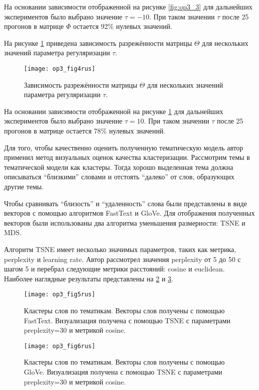 На основании зависимости отображенной на рисунке \ref{fig:op3_3} для дальнейших экспериментов было
выбрано значение $ \tau = -10 $. При таком значении $ \tau $ после 25 прогонов в матрице $\Phi $ остается 92\% нулевых значений.

На рисунке \ref{fig:op3_4}  приведена зависимость разрежённости матрицы $\Theta$  для нескольких значений параметра регуляризации $ \tau $.

\begin{figure}[H]
  \caption{Зависимость разрежённости матрицы $ \Theta $ для нескольких значений параметра регуляризации $ \tau $.}
  \centering
    \texttt{[image: op3\_fig4rus]}
  \label{fig:op3_4}
\end{figure}  

На основании зависимости отображенной на рисунке  \ref{fig:op3_4}  для дальнейших экспериментов было выбрано значение $ \tau  = 10 $. 
При таком значении $ \tau $ после 25 прогонов в матрице остается 78\% нулевых значений.

Для того, чтобы качественно оценить полученную тематическую модель автор применил метод визуальных оценок качества кластеризации.
Рассмотрим темы в тематической модели как кластеры. Тогда хорошо выделенная тема должна описываться ``близкими'' словами и отстоять
``далеко'' от слов, образующих другие темы.

Чтобы сравнивать ``близость'' и ``удаленность'' слова были представлены в виде векторов с помощью алгоритмов FastText и GloVe. Для отображения
полученных векторов были использованы два алгоритма уменьшения размерности: TSNE и MDS.

Алгоритм TSNE имеет несколько значимых параметров, таких как метрика,
perplexity и learning rate. Автор рассмотрел значения perplexity от 5
до 50 с шагом 5 и перебрал следующие метрики расстояний: cosine и euclidean. 
Наиболее наглядные результаты представлены на \ref{fig:op3_5} и \ref{fig:op3_6}. 

\begin{figure}[H]
  \caption{Кластеры слов по тематикам. Векторы слов получены с помощью FastText. Визуализация получена с помощью TSNE с параметрами preplexity=30 и метрикой cosine.}
  \centering
    \texttt{[image: op3\_fig5rus]}
  \label{fig:op3_5}
\end{figure}

\begin{figure}[H]
  \caption{Кластеры слов по тематикам. Векторы слов получены с помощью GloVe. Визуализация получена с помощью TSNE с параметрами preplexity=30 и метрикой cosine.}
  \centering
    \texttt{[image: op3\_fig6rus]}
  \label{fig:op3_6}
\end{figure}

